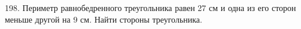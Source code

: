 198. Периметр равнобедренного треугольника равен 27 см и одна из его сторон меньше другой на 9 см. Найти стороны треугольника.\\
